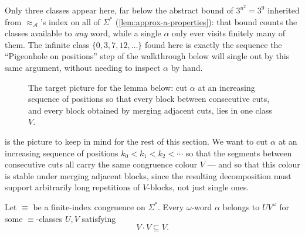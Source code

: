 \begin{example}
Only three classes appear here, far below the abstract bound of
$3^{n^2}=3^9$ inherited from $\approx_{\mathcal A}$'s index on all of
$\Sigma^*$ (\cref{lem:approx-a-properties}): that bound counts the
classes available to \emph{any} word, while a single $\alpha$ only ever
visits finitely many of them.  The infinite class
$\{0,3,7,12,\ldots\}$ found here is exactly the sequence the
``Pigeonhole on positions'' step of the walkthrough below will single
out by this same argument, without needing to inspect $\alpha$ by hand.
\end{example}

\begin{figure}[ht]
\centering
{}
\caption{The target picture for the lemma below: cut $\alpha$ at an
increasing sequence of positions so that every block between
consecutive cuts, and every block obtained by merging adjacent cuts,
lies in one class $V$.}
\label{fig:ramsey-cuts}
\end{figure}

 is the picture to keep in mind for the rest of
this section.  We want to cut $\alpha$ at an increasing sequence of
positions $k_0<k_1<k_2<\cdots$ so that the segments between consecutive
cuts all carry the same congruence colour $V$ --- and so that this
colour is stable under merging adjacent blocks, since the resulting
decomposition must support arbitrarily long repetitions of $V$-blocks,
not just single ones.

\begin{lemma}
\label{lem:ramsey-decomposition}
Let $\equiv$ be a finite-index congruence on $\Sigma^*$.  Every
$\omega$-word $\alpha$ belongs to $UV^\omega$ for some
$\equiv$-classes $U,V$ satisfying
\[
  V\cdot V \subseteq V.
\]
\end{lemma}

